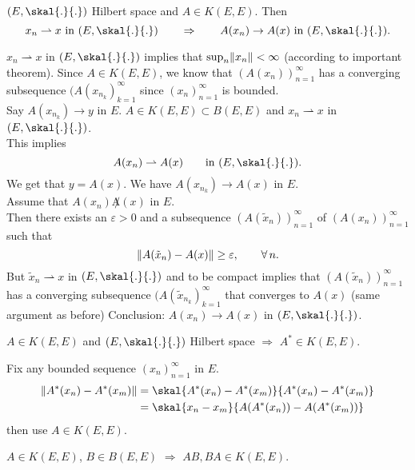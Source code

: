 \begin{proposition}
	$(E,\skal{.}{.})$ Hilbert space and $A \in K(E,E)$. Then \[
		x_n \rightharpoonup x \text{ in } (E, \skal{.}{.}) \qquad \Rightarrow \qquad A(x_n) \to A(x) \text{ in }(E,\skal{.}{.}).
	\]
\end{proposition}
\begin{beweis}
	$x_n \rightharpoonup x$ in $(E,\skal{.}{.})$ implies that $\sup_n \norm{x_n}< \infty$ (according to important theorem). Since $A \in K(E,E)$, we know that $(A(x_n))_{n=1}^{\infty}$ has a converging subsequence $(A(x _{n_k})_{k=1}^{\infty}$ since $(x_n)_{n=1}^{\infty}$ is bounded. \\
	Say $A(x _{n_k}) \to y$ in $E$. $A \in K(E,E) \subset B(E,E)$ and $x_n \rightharpoonup x$ in $(E, \skal{.}{.})$. \\
	This implies
	\[
		A(x_n) \rightharpoonup A(x) \qquad \text{in }(E,\skal{.}{.}).
	\]
	We get that $y = A(x)$. We have $A(x _{n_k}) \to A(x)$ in $E$. \\
	Assume that $A(x_n) \not A(x)$ in $E$. \\
	Then there exists an $\varepsilon >0$ and a subsequence $(A(\tilde x_n))_{n=1}^{\infty}$ of $(A(x_n))_{n=1}^{\infty}$ such that
	\[
		\norm{A( \tilde x_n) - A(x)} \geq \varepsilon, \qquad \forall\,  n.
	\]
	But $\tilde x_n \rightharpoonup x$ in $(E,\skal{.}{.})$ and to be compact implies that $(A(\tilde x_n))_{n=1}^{\infty}$ has a converging subsequence $(A( \tilde x _{n_k})_{k=1}^{\infty}$ that converges to $A(x)$ (same argument as before)
	Conclusion: $A(x_n) \to A(x)$ in $(E, \skal{.}{.})$.
\end{beweis}

\begin{proposition}
	$A \in K(E,E)$ and $(E, \skal{.}{.})$ Hilbert space \qquad $\Rightarrow $ $A^* \in K(E,E)$.
\end{proposition}
\begin{beweis}
	Fix any bounded sequence $(x_n)_{n=1}^{\infty}$ in $E$. 
	\begin{align*}
		\norm{A^*(x_n)-A^*(x_m)} &= \skal{A^*(x_n)-A^*(x_m)}{A^*(x_n)-A^*(x_m)} \\
		&= \skal{x_n-x_m}{A(A^*(x_n))-A(A^*(x_m))} 
	\end{align*}
	then use $A \in K(E,E)$.
\end{beweis}

\begin{proposition}
	$A \in K(E,E)$, $B \in B(E,E)$ \qquad $\Rightarrow $ $AB,BA \in K(E,E)$.
\end{proposition}

